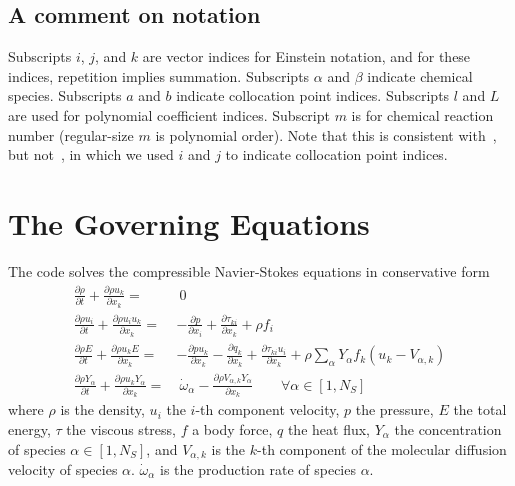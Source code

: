 \documentclass[notitlepage]{revtex4-1}
\begin{document}
\subsection{A comment on notation}

Subscripts $i$, $j$, and $k$ are vector indices for Einstein notation, and for these indices, repetition implies summation. Subscripts $\alpha$ and $\beta$ indicate chemical species. Subscripts $a$ and $b$ indicate collocation point indices. Subscripts $l$ and $L$ are used for polynomial coefficient indices. Subscript $m$ is for chemical reaction number (regular-size $m$ is polynomial order). Note that this is consistent with~\cite{king_2024}, but not~\cite{king_2020,king_2022}, in which we used $i$ and $j$ to indicate collocation point indices.

\section{The Governing Equations}\label{ge}

The code solves the compressible Navier-Stokes equations in conservative form
\begin{subequations}\begin{align}
\frac{\partial\rho}{\partial{t}}+\frac{\partial\rho{u}_{k}}{\partial{x}_{k}}=&~0\label{eq:mass}\\
\frac{\partial\rho{u}_{i}}{\partial{t}}+\frac{\partial\rho{u}_{i}u_{k}}{\partial{x}_{k}}=&-\frac{\partial{p}}{\partial{x}_{i}}+\frac{\partial\tau_{ki}}{\partial{x}_{k}}+\rho{f}_{i}\label{eq:mom}\\
\frac{\partial\rho{E}}{\partial{t}}+\frac{\partial\rho{u}_{k}E}{\partial{x}_{k}}=&-\frac{\partial{p}u_{k}}{\partial{x}_{k}}-\frac{\partial{q}_{k}}{\partial{x}_{k}}+\frac{\partial\tau_{ki}u_{i}}{\partial{x}_{k}}+\rho\displaystyle\sum_{\alpha}Y_{\alpha}f_{k}\left({u}_{k}-V_{\alpha,k}\right)\label{eq:en}\\
\frac{\partial\rho{Y}_{\alpha}}{\partial{t}}+\frac{\partial\rho{u}_{k}Y_{\alpha}}{\partial{x}_{k}}=&~\dot\omega_{\alpha}-\frac{\partial\rho{V}_{\alpha,k}Y_{\alpha}}{\partial{x}_{k}}\qquad\forall\alpha\in\left[1,N_{S}\right]\label{eq:Y}
\end{align}
\end{subequations}
where $\rho$ is the density, ${u}_{i}$ the $i$-th component velocity, $p$ the pressure, $E$ the total energy, $\tau$ the viscous stress, $f$ a body force, $q$ the heat flux, $Y_{\alpha}$ the concentration of species $\alpha\in\left[1,N_{S}\right]$, and $V_{\alpha,k}$ is the $k$-th component of the molecular diffusion velocity of species $\alpha$. $\dot\omega_{\alpha}$ is the production rate of species $\alpha$.
\end{document}
